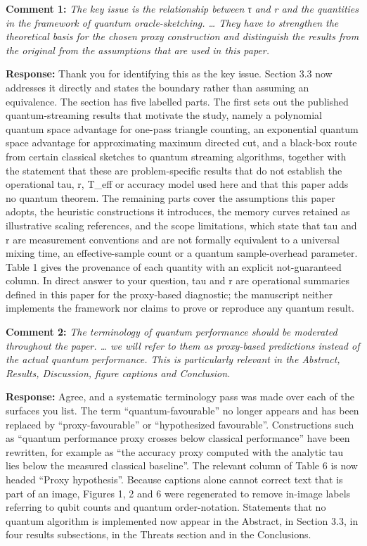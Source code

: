 \documentclass[
  11pt,
]{article}
\begin{document}
\textbf{Comment 1:} \emph{The key issue is the relationship between τ
and r and the quantities in the framework of quantum oracle-sketching.
\ldots{} They have to strengthen the theoretical basis for the chosen
proxy construction and distinguish the results from the original from
the assumptions that are used in this paper.}

\textbf{Response:} Thank you for identifying this as the key issue.
Section 3.3 now addresses it directly and states the boundary rather
than assuming an equivalence. The section has five labelled parts. The
first sets out the published quantum-streaming results that motivate the
study, namely a polynomial quantum space advantage for one-pass triangle
counting, an exponential quantum space advantage for approximating
maximum directed cut, and a black-box route from certain classical
sketches to quantum streaming algorithms, together with the statement
that these are problem-specific results that do not establish the
operational tau, r, T\_eff or accuracy model used here and that this
paper adds no quantum theorem. The remaining parts cover the assumptions
this paper adopts, the heuristic constructions it introduces, the memory
curves retained as illustrative scaling references, and the scope
limitations, which state that tau and r are measurement conventions and
are not formally equivalent to a universal mixing time, an
effective-sample count or a quantum sample-overhead parameter. Table 1
gives the provenance of each quantity with an explicit not-guaranteed
column. In direct answer to your question, tau and r are operational
summaries defined in this paper for the proxy-based diagnostic; the
manuscript neither implements the framework nor claims to prove or
reproduce any quantum result.

\textbf{Comment 2:} \emph{The terminology of quantum performance should
be moderated throughout the paper. \ldots{} we will refer to them as
proxy-based predictions instead of the actual quantum performance. This
is particularly relevant in the Abstract, Results, Discussion, figure
captions and Conclusion.}

\textbf{Response:} Agree, and a systematic terminology pass was made
over each of the surfaces you list. The term ``quantum-favourable'' no
longer appears and has been replaced by ``proxy-favourable'' or
``hypothesized favourable''. Constructions such as ``quantum performance
proxy crosses below classical performance'' have been rewritten, for
example as ``the accuracy proxy computed with the analytic tau lies
below the measured classical baseline''. The relevant column of Table 6
is now headed ``Proxy hypothesis''. Because captions alone cannot
correct text that is part of an image, Figures 1, 2 and 6 were
regenerated to remove in-image labels referring to qubit counts and
quantum order-notation. Statements that no quantum algorithm is
implemented now appear in the Abstract, in Section 3.3, in four results
subsections, in the Threats section and in the Conclusions.
\end{document}
